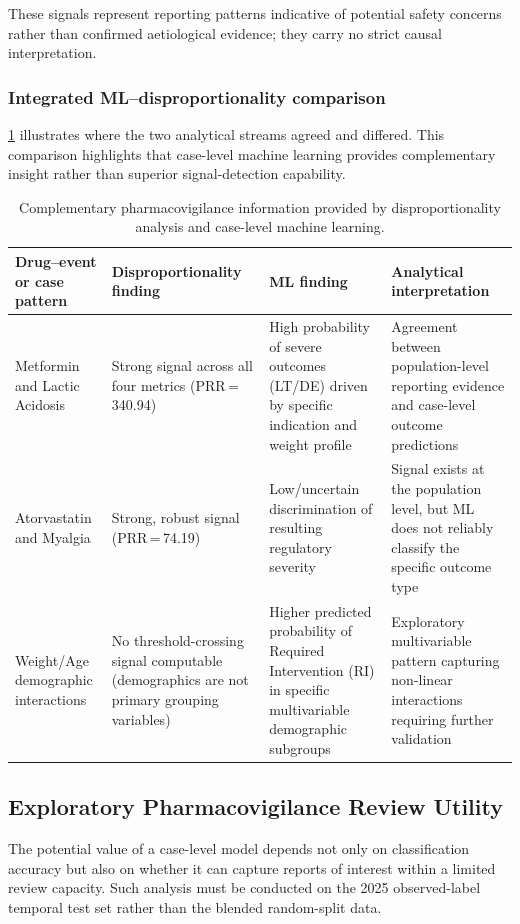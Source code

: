 \documentclass[10pt]{article}
\begin{document}
These signals represent reporting patterns indicative of potential safety concerns rather than confirmed aetiological evidence; they carry no strict causal interpretation.

\subsubsection{Integrated ML--disproportionality comparison}
\cref{tab:ml_disprop_comparison} illustrates where the two analytical streams agreed and differed. This comparison highlights that case-level machine learning provides complementary insight rather than superior signal-detection capability. 

\begin{table}[htbp]
\caption{Complementary pharmacovigilance information provided by disproportionality analysis and case-level machine learning.}
\label{tab:ml_disprop_comparison}
\centering\small\setlength{\tabcolsep}{4pt}
\begin{tabularx}{\textwidth}{|>{\raggedright\arraybackslash\hsize=0.8\hsize}X|>{\raggedright\arraybackslash\hsize=1.0\hsize}X|>{\raggedright\arraybackslash\hsize=1.0\hsize}X|>{\raggedright\arraybackslash\hsize=1.2\hsize}X|}
\hline
\textbf{Drug--event or case pattern} & \textbf{Disproportionality finding} & \textbf{ML finding} & \textbf{Analytical interpretation} \\
\hline
Metformin and Lactic Acidosis & Strong signal across all four metrics (PRR\,=\,340.94) & High probability of severe outcomes (LT/DE) driven by specific indication and weight profile & Agreement between population-level reporting evidence and case-level outcome predictions \\
\hline
Atorvastatin and Myalgia & Strong, robust signal (PRR\,=\,74.19) & Low/uncertain discrimination of resulting regulatory severity & Signal exists at the population level, but ML does not reliably classify the specific outcome type \\
\hline
Weight/Age demographic interactions & No threshold-crossing signal computable (demographics are not primary grouping variables) & Higher predicted probability of Required Intervention (RI) in specific multivariable demographic subgroups & Exploratory multivariable pattern capturing non-linear interactions requiring further validation \\
\hline
\end{tabularx}
\end{table}

\subsection{Exploratory Pharmacovigilance Review Utility}
The potential value of a case-level model depends not only on classification accuracy but also on whether it can capture reports of interest within a limited review capacity. Such analysis must be conducted on the 2025 observed-label temporal test set rather than the blended random-split data.
\end{document}
